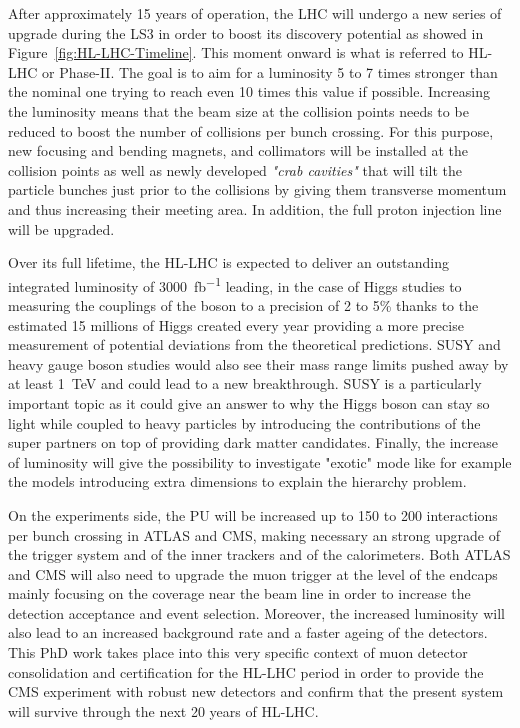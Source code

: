 	After approximately 15 years of operation, the LHC will undergo a new series of upgrade during the LS3 in order to boost its discovery potential as showed in Figure~\ref{fig:HL-LHC-Timeline}. This moment onward is what is referred to HL-LHC or Phase-II. The goal is to aim for a luminosity 5 to 7 times stronger than the nominal one trying to reach even 10 times this value if possible. Increasing the luminosity means that the beam size at the collision points needs to be reduced to boost the number of collisions per bunch crossing. For this purpose, new focusing and bending magnets, and collimators will be installed at the collision points as well as newly developed \textit{"crab cavities"} that will tilt the particle bunches just prior to the collisions by giving them transverse momentum and thus increasing their meeting area. In addition, the full proton injection line will be upgraded.
	
	Over its full lifetime, the HL-LHC is expected to deliver an outstanding integrated luminosity of \SI{3000}{fb^{-1}} leading, in the case of Higgs studies to measuring the couplings of the boson to a precision of 2 to 5\% thanks to the estimated 15 millions of Higgs created every year providing a more precise measurement of potential deviations from the theoretical predictions. SUSY and heavy gauge boson studies would also see their mass range limits pushed away by at least \SI{1}{TeV} and could lead to a new breakthrough. SUSY is a particularly important topic as it could give an answer to why the Higgs boson can stay so light while coupled to heavy particles by introducing the contributions of the super partners on top of providing dark matter candidates. Finally, the increase of luminosity will give the possibility to investigate "exotic" mode like for example the models introducing extra dimensions to explain the hierarchy problem.
	
	On the experiments side, the \acf{PU} will be increased up to 150 to 200 interactions per bunch crossing in ATLAS and CMS, making necessary an strong upgrade of the trigger system and of the inner trackers and of the calorimeters. Both ATLAS and CMS will also need to upgrade the muon trigger at the level of the endcaps mainly focusing on the coverage near the beam line in order to increase the detection acceptance and event selection. Moreover, the increased luminosity will also lead to an increased background rate and a faster ageing of the detectors. This PhD work takes place into this very specific context of muon detector consolidation and certification for the HL-LHC period in order to provide the CMS experiment with robust new detectors and confirm that the present system will survive through the next 20 years of HL-LHC.

